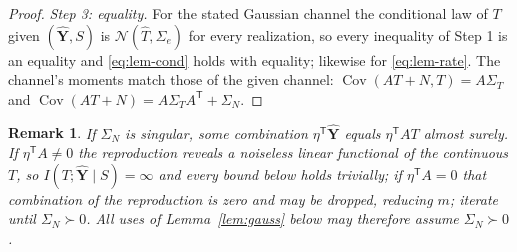 \documentclass[11pt,onecolumn]{IEEEtran}
\newtheorem{remark}[theorem]{Remark}
\newcommand{\Cov}{\operatorname{Cov}}
\begin{document}
\begin{proof}
\emph{Step 3: equality.} For the stated Gaussian channel the conditional
law of $T$ given $(\hat{\mathbf Y},S)$ is $\mathcal N(\widehat T,\Sigma_e)$
for every realization, so every inequality of Step 1 is an equality and
\eqref{eq:lem-cond} holds with equality; likewise for \eqref{eq:lem-rate}. The channel's moments match those of
the given channel: $\Cov(AT+N,T)=A\Sigma_T$ and
$\Cov(AT+N)=A\Sigma_TA^{\mathsf T}+\Sigma_N$.
\end{proof}

\begin{remark}\label{rem:degenerate}
If $\Sigma_N$ is singular, some combination
$\eta^{\mathsf T}\hat{\mathbf Y}$ equals $\eta^{\mathsf T}AT$ almost
surely. If $\eta^{\mathsf T}A\ne0$ the reproduction reveals a noiseless linear
functional of the continuous $T$, so
$I(T;\hat{\mathbf Y}\mid S)=\infty$ and every bound below holds
trivially; if $\eta^{\mathsf T}A=0$ that combination of the reproduction is
zero and may be dropped, reducing $m$; iterate until $\Sigma_N\succ0$. All uses of
Lemma~\ref{lem:gauss} below may therefore assume $\Sigma_N\succ0$.
\end{remark}
\end{document}
